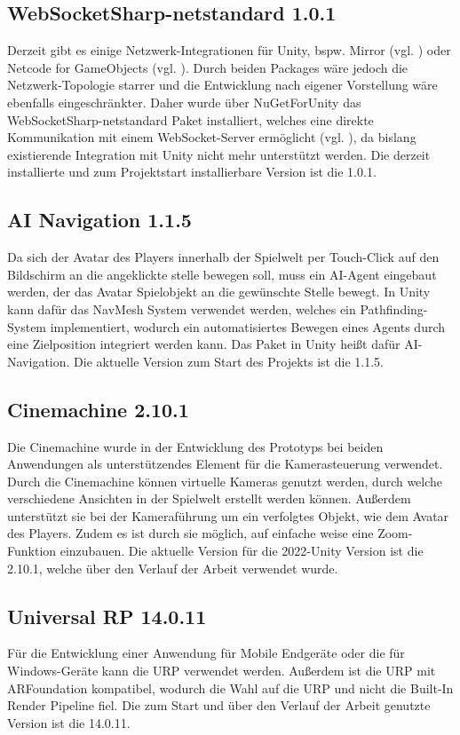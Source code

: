 \subsection{WebSocketSharp-netstandard 1.0.1}
Derzeit gibt es einige Netzwerk-Integrationen für Unity, bspw. Mirror (vgl. \cite{noauthor_mirror_nodate}) oder Netcode for GameObjects (vgl. \cite{noauthor_about_2025}). Durch beiden Packages wäre jedoch die Netzwerk-Topologie starrer und die Entwicklung nach eigener Vorstellung wäre ebenfalls eingeschränkter. Daher wurde über NuGetForUnity das WebSocketSharp-netstandard Paket installiert, welches eine direkte Kommunikation mit einem WebSocket-Server ermöglicht (vgl. \cite{pingman_tools_pingmantoolswebsocket-sharp_2025}), da bislang existierende Integration mit Unity nicht mehr unterstützt werden. Die derzeit installierte und zum Projektstart installierbare Version ist die 1.0.1.

\subsection{AI Navigation 1.1.5}
Da sich der Avatar des Players innerhalb der Spielwelt per Touch-Click auf den Bildschirm an die angeklickte stelle bewegen soll, muss ein \ac{AI}-Agent eingebaut werden, der das Avatar Spielobjekt an die gewünschte Stelle bewegt. In Unity kann dafür das NavMesh System verwendet werden, welches ein Pathfinding-System implementiert, wodurch ein automatisiertes Bewegen eines Agents durch eine Zielposition integriert werden kann. Das Paket in Unity heißt dafür \ac{AI}-Navigation. Die aktuelle Version zum Start des Projekts ist die 1.1.5.

\subsection{Cinemachine 2.10.1}
Die Cinemachine wurde in der Entwicklung des Prototyps bei beiden Anwendungen als unterstützendes Element für die Kamerasteuerung verwendet. Durch die Cinemachine können virtuelle Kameras genutzt werden, durch welche verschiedene Ansichten in der Spielwelt erstellt werden können. Außerdem unterstützt sie bei der Kameraführung um ein verfolgtes Objekt, wie dem Avatar des Players. Zudem es ist durch sie möglich, auf einfache weise eine Zoom-Funktion einzubauen. Die aktuelle Version für die 2022-Unity Version ist die 2.10.1, welche über den Verlauf der Arbeit verwendet wurde.

\subsection{Universal RP 14.0.11}
Für die Entwicklung einer Anwendung für Mobile Endgeräte oder die für Windows-Geräte kann die \ac{URP} verwendet werden. Außerdem ist die \ac{URP} mit ARFoundation kompatibel, wodurch die Wahl auf die \ac{URP} und nicht die Built-In Render Pipeline fiel. Die zum Start und über den Verlauf der Arbeit genutzte Version ist die 14.0.11.

